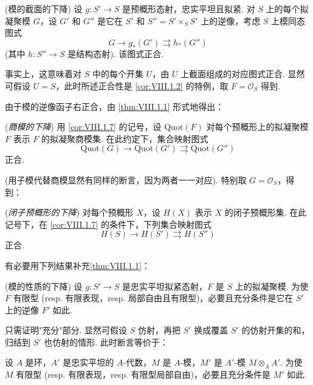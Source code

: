 \begin{corollary}\label{cor:VIII.1.7}
(模的截面的下降) 设 $g \colon S' \to S$ 是预概形态射，忠实平坦且拟紧. 对 $S$ 上的每个拟凝聚模 $G$，设 $G'$ 和 $G''$ 是它在 $S'$ 和 $S'' = S' \times_S S'$ 上的逆像，考虑 $S$ 上模同态图式
\[
G \longrightarrow g_{*}(G') \rightrightarrows h_{*}(G'')
\]
(其中 $h \colon S'' \to S$ 是结构态射). 该图式正合.
\end{corollary}

事实上，这意味着对 $S$ 中的每个开集 $U$，由 $U$ 上截面组成的对应图式正合. 显然可假设 $U = S$，此时所述正合性是 \ref{cor:VIII.1.2} 的特例，取 $F = \mathcal{O}_S$ 得到.

由于模的逆像函子右正合，由 \ref{thm:VIII.1.1} 形式地得出：

\begin{corollary}\label{cor:VIII.1.8}
(\emph{商模的下降}) 用 \ref{cor:VIII.1.7} 的记号，设 $\mathrm{Quot}(F)$ 对每个预概形上的拟凝聚模 $F$ 表示 $F$ 的拟凝聚商模集. 在此约定下，集合映射图式
\[
\mathrm{Quot}(G) \longrightarrow \mathrm{Quot}(G') \rightrightarrows \mathrm{Quot}(G'')
\]
正合.
\end{corollary}

(用子模代替商模显然有同样的断言，因为两者一一对应). 特别取 $G = \mathcal{O}_S$，得到：

\begin{corollary}\label{cor:VIII.1.9}
(\emph{闭子预概形的下降}) 对每个预概形 $X$，设 $H(X)$ 表示 $X$ 的闭子预概形集. 在此记号下，在 \ref{cor:VIII.1.7} 的条件下，下列集合映射图式
\[
H(S) \longrightarrow H(S') \rightrightarrows H(S'')
\]
正合.
\end{corollary}

有必要用下列结果补充\cref{thm:VIII.1.1}：

\begin{proposition}\label{prop:VIII.1.10}
(模的性质的下降) 设 $g \colon S' \to S$ 是忠实平坦拟紧态射，$F$ 是 $S$ 上的拟凝聚模. 为使 $F$ 有限型 (resp. 有限表现，resp. 局部自由且有限型)，必要且充分条件是它在 $S'$ 上的逆像 $F'$ 如此.
\end{proposition}

只需证明"充分"部分. 显然可假设 $S$ 仿射，再把 $S'$ 换成覆盖 $S'$ 的仿射开集的和，归结到 $S'$ 也仿射的情形. 此时断言等价于：

\begin{corollary}\label{cor:VIII.1.11}
设 $A$ 是环，$A'$ 是忠实平坦的 $A$-代数，$M$ 是 $A$-模，$M'$ 是 $A'$-模 $M \otimes_A A'$. 为使 $M$ 有限型 (resp. 有限表现，resp. 有限型局部自由)，必要且充分条件是 $M'$ 如此.
\end{corollary}

